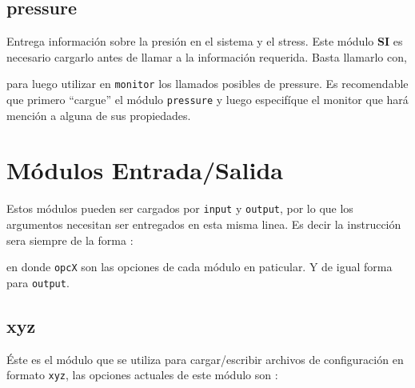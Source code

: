 \subsection{pressure}

Entrega informaci\'on sobre la presi\'on en el sistema y el stress. Este m\'odulo \textbf{SI} es necesario cargarlo antes de llamar a la informaci\'on requerida. Basta llamarlo con,


para luego utilizar en \verb|monitor| los llamados posibles de pressure. Es recomendable que primero ``cargue'' el m\'odulo \verb|pressure| y luego especif\'ique el monitor que har\'a menci\'on a alguna de sus propiedades.


\section{M\'odulos Entrada/Salida}
\label{chap:modulos:entradasalida}
Estos m\'odulos pueden ser cargados por \verb|input| y \verb|output|, por lo que los argumentos necesitan ser entregados en esta misma linea. Es decir la instrucci\'on sera siempre de la forma :


en donde \verb|opcX| son las opciones de cada m\'odulo en paticular. Y de igual forma para \verb|output|.

\subsection{xyz}
\'Este es el m\'odulo que se utiliza para cargar/escribir archivos de configuraci\'on en formato \verb|xyz|, las opciones actuales de este m\'odulo son :


